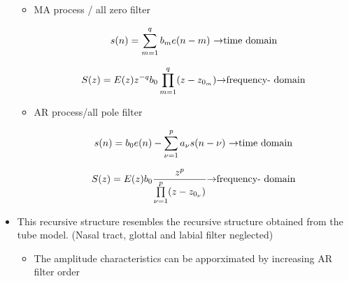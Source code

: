 \begin{itemize}
\begin{itemize}

\item MA process / all zero filter

\begin{equation}\filtOutFunc(\indexTime) = \sum_{\maConvIndex = 1}^{\maFiltOrder}\maFiltCoef_{\maConvIndex}\excitationFunc(\indexTime - \maConvIndex)\mbox{ \begin{math}\rightarrow\end{math}time domain}\end{equation}

\begin{equation}\MakeUppercase{\filtOutFunc}(z) = \MakeUppercase{\excitationFunc}(z)z^{-\maFiltOrder}\maFiltCoef_0 \prod\limits^{\maFiltOrder}_{\maConvIndex=1}(z - z_{0_{\maConvIndex}})\mbox{\begin{math}\rightarrow\end{math}frequency- domain}\end{equation}

\item AR process/all pole filter

\begin{equation}\filtOutFunc(\indexTime) = \maFiltCoef_0\excitationFunc(\indexTime) - \sum_{\arConvIndex =  1}^{\arFiltOrder}\arFiltCoef_{\arConvIndex}\filtOutFunc(\indexTime - \arConvIndex)\mbox{ \begin{math}\rightarrow\end{math}time domain}\end{equation}

\begin{equation}\MakeUppercase{\filtOutFunc}(z) = \MakeUppercase{\excitationFunc}(z)\maFiltCoef_0 \frac{z^{\arFiltOrder}}{\prod\limits^{\arFiltOrder}_{\arConvIndex=1}(z-z_{0_{\arConvIndex}})}\mbox{\begin{math}\rightarrow\end{math}frequency- domain}\end{equation}

\end{itemize}

\item This recursive structure resembles the recursive structure obtained from the tube model. (Nasal tract, glottal and labial filter neglected)

\begin{itemize}

\item The amplitude characteristics can be apporximated by increasing AR filter order


\end{itemize}
\end{itemize}
